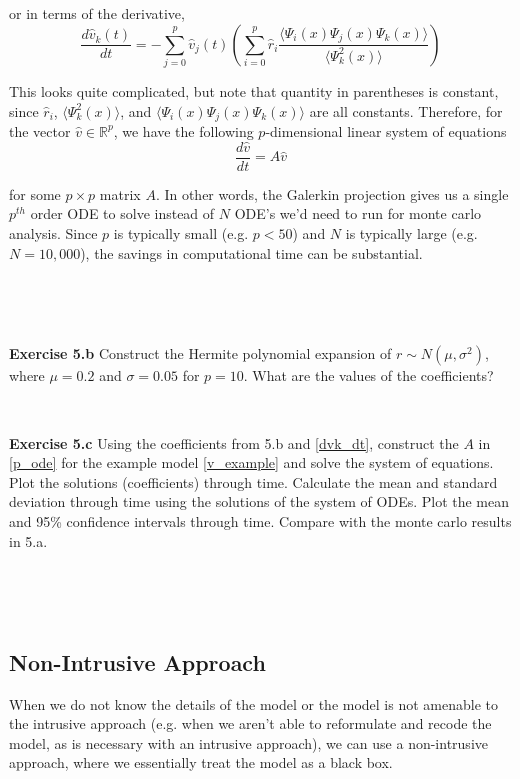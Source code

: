\documentclass[11pt]{article}
\numberwithin{equation}{section}
\begin{document}
or in terms of the derivative,
\begin{equation}
\frac{d\hat{v}_k(t)}{dt} = - \sum_{j=0}^p \hat{v}_j(t) \left( \sum_{i=0}^p \hat{r}_i \frac{\langle \Psi_i(x) \Psi_j(x) \Psi_k(x) \rangle}{\langle \Psi_k^2(x) \rangle } \right) \label{dvk_dt}
\end{equation}

This looks quite complicated, but note that quantity in parentheses is constant, since $\hat{r}_i$, $\langle \Psi_k^2(x) \rangle$, and $\langle \Psi_i(x) \Psi_j(x) \Psi_k(x) \rangle$ are all constants. Therefore, for the vector $\hat{v} \in \mathbb{R}^p$, we have the following $p$-dimensional linear system of equations
\begin{equation}
\frac{d \hat{v}}{dt} = A \hat{v} \label{p_ode}
\end{equation}

for some $p \times p$ matrix $A$. In other words, the Galerkin projection gives us a single $p^{th}$ order ODE to solve instead of $N$ ODE's we'd need to run for monte carlo analysis. Since $p$ is typically small (e.g. $p < 50$) and $N$ is typically large (e.g. $N = 10,000$), the savings in computational time can be substantial.



\

\

\textbf{Exercise 5.b} Construct the Hermite polynomial expansion of $r \sim N(\mu, \sigma^2)$, where $\mu = 0.2$ and $\sigma = 0.05$ for $p = 10$. What are the values of the coefficients?

\

\textbf{Exercise 5.c} Using the coefficients from 5.b and \eqref{dvk_dt}, construct the $A$ in \eqref{p_ode} for the example model \eqref{v_example} and solve the system of equations. Plot the solutions (coefficients) through time. Calculate the mean and standard deviation through time using the solutions of the system of ODEs. Plot the mean and 95\% confidence intervals through time. Compare with the monte carlo results in 5.a.

\

\



\subsection{Non-Intrusive Approach}

When we do not know the details of the model or the model is not amenable to the intrusive approach (e.g. when we aren't able to reformulate and recode the model, as is necessary with an intrusive approach), we can use a non-intrusive approach, where we essentially treat the model as a black box.
\end{document}
